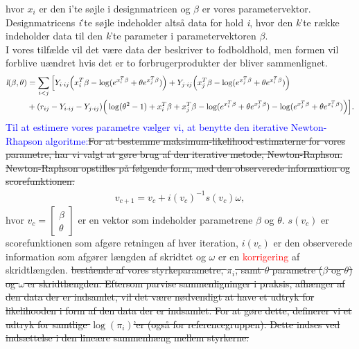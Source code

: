 \documentclass[11pt,a4paper]{article}
\begin{document}
hvor $x_i$ er den i'te søjle i designmatricen og $\beta$ er vores parametervektor. Designmatricens \textit{i}'te søjle indeholder altså data for hold \textit{i}, hvor den \textit{k}'te række indeholder data til den \textit{k}'te parameter i parametervektoren $\beta$. \\
I vores tilfælde vil det være data der beskriver to fodboldhold, men formen vil forblive uændret hvis det er to forbrugerprodukter der bliver sammenlignet.
\begin{align*}
\textit{l}(\beta,\theta)
&=\sum_{i<j}\Big{[}Y_{i\cdot ij}\Big{(}x_i^T\beta-\log(e^{x_i^T\beta}+\theta e^{x_j^T\beta})\Big{)}
+Y_{j\cdot ij}\Big{(}x_j^T\beta-\log(e^{x_j^T\beta}+\theta e^{x_i^T\beta})\Big{)}\\
& +(r_{ij}-Y_{i\cdot ij}-Y_{j\cdot ij}) \Big{(} \log(\theta^2-1)+x_i^T\beta+x_j^T\beta-\log(e^{x_i^T\beta}+\theta e^{x_j^T\beta})-\log(e^{x_j^T\beta}+\theta e^{x_i^T\beta})\Big{)}\Big{]}.
\end{align*}
\textcolor{blue}{Til at estimere vores parametre vælger vi, at benytte den iterative Newton-Rhapson algoritme:}\sout{For at bestemme maksimum-likelihood estimaterne for vores parametre, har vi valgt at gøre brug af den iterative metode, Newton-Raphson. Newton-Raphson opstilles på følgende form, med den observerede information og scorefunktionen:}
\begin{align*}
v_{c+1} = v_{c} + i(v_{c})^{-1}s(v_{c})\omega,
\end{align*}
hvor $v_{c}=\begin{bmatrix} \beta\\\theta\end{bmatrix}$ er en vektor som indeholder parametrene $\beta$ og $\theta$. $s(v_{c})$ er scorefunktionen som afgøre retningen af hver iteration, $i(v_c)$ er den observerede information som afgører længden af skridtet og $\omega$ er en \textcolor{red}{korrigering} af skridtlængden. \sout{ bestående af vores styrkeparametre, $\pi_i$, samt $\theta$ parametre ($\beta$ og $\theta$) og $\omega$ er skridtlængden. Eftersom parvise sammenligninger i praksis, afhænger af den data der er indsamlet, vil det være nødvendigt at have et udtryk for likelihooden i form af den data der er indsamlet. For at gøre dette, definerer vi et udtryk for samtlige $\log( \pi_i)$'er (også for referencegruppen). Dette indses ved indsættelse i den lineære sammenhæng mellem styrkerne:}
\end{document}
